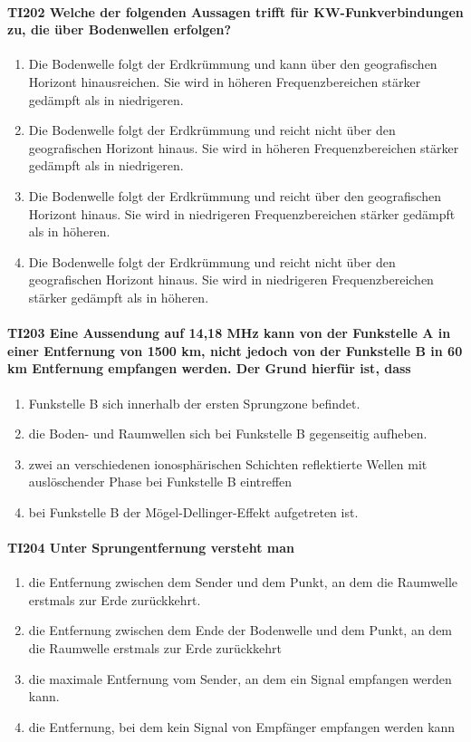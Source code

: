 \documentclass[8pt]{article}
\begin{document}
\paragraph*{TI202 Welche der folgenden Aussagen trifft für KW-Funkverbindungen zu, die über Bodenwellen erfolgen?}
\begin{enumerate}[nolistsep,label=\Alph*]
\item Die Bodenwelle folgt der Erdkrümmung und kann über den geografischen Horizont hinausreichen. Sie wird in höheren Frequenzbereichen stärker gedämpft als in niedrigeren.
\item Die Bodenwelle folgt der Erdkrümmung und reicht nicht über den geografischen Horizont hinaus. Sie wird in höheren Frequenzbereichen stärker gedämpft als in niedrigeren.
\item Die Bodenwelle folgt der Erdkrümmung und reicht über den geografischen Horizont hinaus. Sie wird in niedrigeren Frequenzbereichen stärker gedämpft als in höheren.
\item Die Bodenwelle folgt der Erdkrümmung und reicht nicht über den geografischen Horizont hinaus. Sie wird in niedrigeren Frequenzbereichen stärker gedämpft als in höheren.
\end{enumerate}

\paragraph*{TI203 Eine Aussendung auf 14,18 MHz kann von der Funkstelle A in einer Entfernung von 1500 km, nicht jedoch von der Funkstelle B in 60 km Entfernung empfangen werden. Der Grund hierfür ist, dass} 
\begin{enumerate}[nolistsep,label=\Alph*]
\item Funkstelle B sich innerhalb der ersten Sprungzone befindet.
\item die Boden- und Raumwellen sich bei Funkstelle B gegenseitig aufheben.
\item zwei an verschiedenen ionosphärischen Schichten reflektierte Wellen mit auslöschender Phase bei Funkstelle B eintreffen
\item bei Funkstelle B der Mögel-Dellinger-Effekt aufgetreten ist.
\end{enumerate}

\paragraph*{TI204 Unter Sprungentfernung versteht man} 
\begin{enumerate}[nolistsep,label=\Alph*]
\item die Entfernung zwischen dem Sender und dem Punkt, an dem die Raumwelle erstmals zur Erde zurückkehrt.
\item die Entfernung zwischen dem Ende der Bodenwelle und dem Punkt, an dem die Raumwelle erstmals zur Erde zurückkehrt
\item die maximale Entfernung vom Sender, an dem ein Signal empfangen werden kann. 
\item die Entfernung, bei dem kein Signal von Empfänger empfangen werden kann
\end{enumerate}
\end{document}
